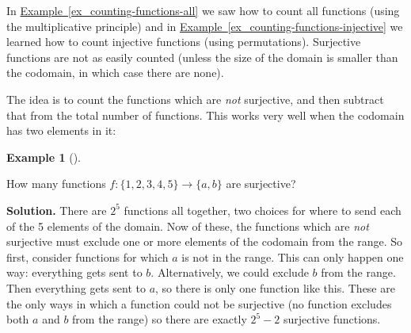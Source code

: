 \documentclass[10pt,]{book}
\theoremstyle{plain}
\theoremstyle{definition}
\newtheorem{example}[theorem]{Example}
\theoremstyle{definition}
\theoremstyle{definition}
\numberwithin{equation}{chapter}
\begin{document}
\par

      In \hyperref[ex_counting-functions-all]{Example~\ref{ex_counting-functions-all}} we saw how to count all functions (using the multiplicative principle) and in \hyperref[ex_counting-functions-injective]{Example~\ref{ex_counting-functions-injective}} we learned how to count injective functions (using permutations).  Surjective functions are not as easily counted (unless the size of the domain is smaller than the codomain, in which case there are none).
\par

    The idea is to count the functions which are \emph{not} surjective, and then subtract that from the total number of functions. This works very well when the codomain has two elements in it:
\begin{example}[]\label{example-52}

    How many functions \(f: \{1,2,3,4,5\} \to \{a,b\}\) are surjective?
\par\medskip\noindent%
\textbf{Solution.}\quad
    There are \(2^5\) functions all together, two choices for where to send each of the 5 elements of the domain. Now of these, the functions which are \emph{not} surjective must exclude one or more elements of the codomain from the range. So first, consider functions for which \(a\) is not in the range. This can only happen one way: everything gets sent to \(b\). Alternatively, we could exclude \(b\) from the range. Then everything gets sent to \(a\), so there is only one function like this. These are the only ways in which a function could not be surjective (no function excludes both \(a\) and \(b\) from the range) so there are exactly \(2^5 - 2\) surjective functions.
\end{example}
\par
\end{document}
